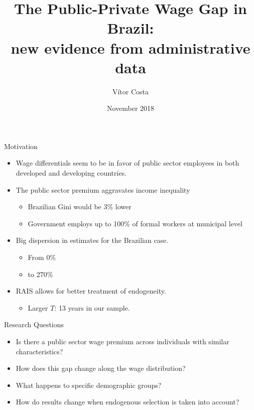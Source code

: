 \documentclass[xcolor={dvipsnames},8pt]{beamer}
\title[V\'{i}tor Costa]{The Public-Private Wage Gap in Brazil:\\ new evidence from administrative data}
\author[RA Progress Report - Wage Gap Project]{V\'{i}tor Costa}
\date{November 2018}
\theoremstyle{definition}
\begin{document}
\begin{frame}[plain]
\titlepage
\addtocounter{framenumber}{-1}
\end{frame}

\begin{frame}{Motivation}
\begin{itemize}
    \item Wage differentials seem to be in favor of public sector employees in both developed and developing countries.
    \item The public sector premium aggravates income inequality
    \begin{itemize}
        \item Brazilian Gini would be 3\% lower \citep{Souza2013}
        \item Government employs up to 100\% of formal workers at municipal level
    \end{itemize}
    \item Big dispersion in estimates for the Brazilian case.
    \begin{itemize}
        \item From 0\% \citep{Emilio2012} 
        \item to 270\% \citep{Tenoury2017}  
    \end{itemize}
    \item RAIS allows for better treatment of endogeneity.
    \begin{itemize}
        \item Larger $T$: 13 years in our sample.
    \end{itemize}
\end{itemize}
\end{frame}


\begin{frame}{Research Questions}

\begin{itemize}
    \item Is there a public sector wage premium across individuals with similar characteristics?\\ 
    \item How does this gap change along the wage distribution?\\
    \item What happens to specific demographic groups?\\
    \item How do results change when endogenous selection is taken into account? 
\end{itemize}
\end{frame}
\end{document}
